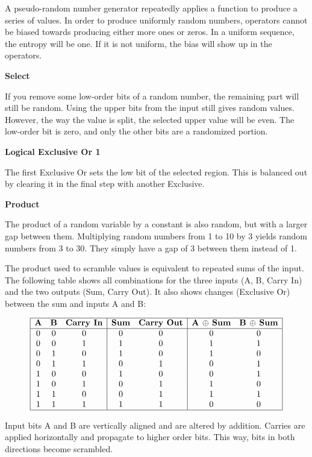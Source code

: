\documentclass[letterpaper]{article}
\begin{document}
\begin{multicols}{2}
A pseudo-random number generator repeatedly applies a function to produce a series of values. In order to produce uniformly random numbers, operators cannot be biased towards producing either more ones or zeros. In a uniform sequence, the entropy will be one. If it is not uniform, the bias will show up in the operators.

\textbf{Select}

If you remove some low-order bits of a random number, the remaining part will still be random. Using the upper bits from the input still gives random values. However, the way the value is split, the selected upper value will be even. The low-order bit is zero, and only the other bits are a randomized portion.

\textbf{Logical Exclusive Or 1}

The first Exclusive Or sets the low bit of the selected region. This is balanced out by clearing it in the final step with another Exclusive.

\textbf{Product}

The product of a random variable by a constant is also random, but with a larger gap between them. Multiplying random numbers from 1 to 10 by 3 yields random numbers from 3 to 30. They simply have a gap of 3 between them instead of 1.

The product used to scramble values is equivalent to repeated sums of the input. The following table shows all combinations for the three inputs (A, B, Carry In) and the two outputs (Sum, Carry Out). It also shows changes (Exclusive Or) between the sum and inputs A and B:

\[
\begin{array}{|c c c|c c|c c|}
\hline
\textbf{A} & \textbf{B} & \textbf{Carry In} & \textbf{Sum} & \textbf{Carry Out} & \textbf{A $\oplus$ Sum} & \textbf{B $\oplus$ Sum} \\ 
\hline
0 & 0 & 0 & 0 & 0 & 0 & 0 \\
0 & 0 & 1 & 1 & 0 & 1 & 1 \\
0 & 1 & 0 & 1 & 0 & 1 & 0 \\
0 & 1 & 1 & 0 & 1 & 0 & 1 \\
1 & 0 & 0 & 1 & 0 & 0 & 1 \\
1 & 0 & 1 & 0 & 1 & 1 & 0 \\
1 & 1 & 0 & 0 & 1 & 1 & 1 \\
1 & 1 & 1 & 1 & 1 & 0 & 0 \\ 
\hline
\end{array}
\]

Input bits A and B are vertically aligned and are altered by addition. Carries are applied horizontally and propagate to higher order bits. This way, bits in both directions become scrambled.


\end{multicols}
\end{document}

